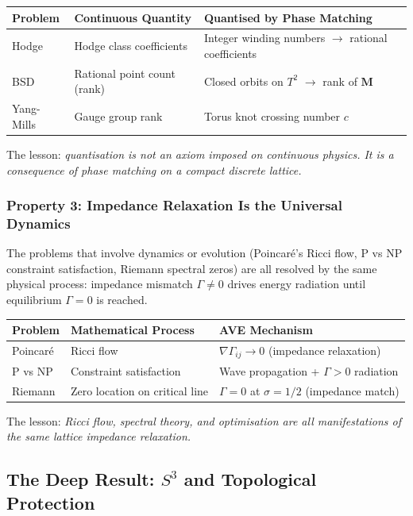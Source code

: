 \begin{center}
\small
\begin{tabular}{lll}
\toprule
\textbf{Problem} & \textbf{Continuous Quantity} & \textbf{Quantised by Phase Matching} \\
\midrule
Hodge & Hodge class coefficients & Integer winding numbers $\to$ rational coefficients \\
BSD & Rational point count (rank) & Closed orbits on $T^2$ $\to$ rank of $\mathbf{M}$ \\
Yang-Mills & Gauge group rank & Torus knot crossing number $c$ \\
\bottomrule
\end{tabular}
\end{center}

The lesson: \textit{quantisation is not an axiom imposed on continuous physics. It is a consequence of phase matching on a compact discrete lattice.}

\subsubsection{Property 3: Impedance Relaxation Is the Universal Dynamics}

The problems that involve dynamics or evolution (Poincar\'e's Ricci flow, P vs NP constraint satisfaction, Riemann spectral zeros) are all resolved by the same physical process: impedance mismatch $\Gamma \neq 0$ drives energy radiation until equilibrium $\Gamma = 0$ is reached.

\begin{center}
\small
\begin{tabular}{lll}
\toprule
\textbf{Problem} & \textbf{Mathematical Process} & \textbf{AVE Mechanism} \\
\midrule
Poincar\'e & Ricci flow & $\nabla \Gamma_{ij} \to 0$ (impedance relaxation) \\
P vs NP & Constraint satisfaction & Wave propagation + $\Gamma > 0$ radiation \\
Riemann & Zero location on critical line & $\Gamma = 0$ at $\sigma = 1/2$ (impedance match) \\
\bottomrule
\end{tabular}
\end{center}

The lesson: \textit{Ricci flow, spectral theory, and optimisation are all manifestations of the same lattice impedance relaxation.}

\subsection{The Deep Result: $S^3$ and Topological Protection}

